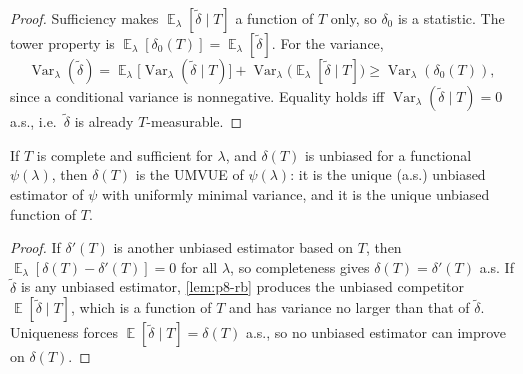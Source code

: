 \documentclass[11pt,a4paper]{article}
\DeclareMathOperator{\Var}{Var}
\DeclareMathOperator{\E}{\mathbb{E}}
\begin{document}
\begin{proof}
Sufficiency makes \(\E_\lambda[\tilde\delta\mid T]\) a function of \(T\) only, so \(\delta_0\) is a statistic. The tower property is \(\E_\lambda[\delta_0(T)]=\E_\lambda[\tilde\delta]\). For the variance,
\[
\Var_\lambda(\tilde\delta)
=
\E_\lambda\bigl[\Var_\lambda(\tilde\delta\mid T)\bigr]
+
\Var_\lambda\bigl(\E_\lambda[\tilde\delta\mid T]\bigr)
\ge
\Var_\lambda(\delta_0(T)),
\]
since a conditional variance is nonnegative. Equality holds iff \(\Var_\lambda(\tilde\delta\mid T)=0\) a.s., i.e.\ \(\tilde\delta\) is already \(T\)-measurable.
\end{proof}

\begin{lemma}
\label{lem:p8-ls}
If \(T\) is complete and sufficient for \(\lambda\), and \(\delta(T)\) is unbiased for a functional \(\psi(\lambda)\), then \(\delta(T)\) is the UMVUE of \(\psi(\lambda)\): it is the unique (a.s.) unbiased estimator of \(\psi\) with uniformly minimal variance, and it is the unique unbiased function of \(T\).
\end{lemma}

\begin{proof}
If \(\delta'(T)\) is another unbiased estimator based on \(T\), then \(\E_\lambda[\delta(T)-\delta'(T)]=0\) for all \(\lambda\), so completeness gives \(\delta(T)=\delta'(T)\) a.s. If \(\tilde\delta\) is any unbiased estimator, \cref{lem:p8-rb} produces the unbiased competitor \(\E[\tilde\delta\mid T]\), which is a function of \(T\) and has variance no larger than that of \(\tilde\delta\). Uniqueness forces \(\E[\tilde\delta\mid T]=\delta(T)\) a.s., so no unbiased estimator can improve on \(\delta(T)\).
\end{proof}
\end{document}
